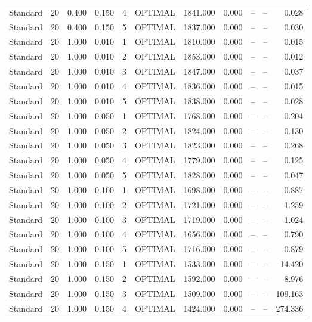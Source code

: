 \begin{table}
\begin{tabular}{lrrrrlrrrrr}
Standard & 20 & 0.400 & 0.150 & 4 & OPTIMAL & 1841.000 & 0.000 & -- & -- & 0.028 \\
Standard & 20 & 0.400 & 0.150 & 5 & OPTIMAL & 1837.000 & 0.000 & -- & -- & 0.030 \\
Standard & 20 & 1.000 & 0.010 & 1 & OPTIMAL & 1810.000 & 0.000 & -- & -- & 0.015 \\
Standard & 20 & 1.000 & 0.010 & 2 & OPTIMAL & 1853.000 & 0.000 & -- & -- & 0.012 \\
Standard & 20 & 1.000 & 0.010 & 3 & OPTIMAL & 1847.000 & 0.000 & -- & -- & 0.037 \\
Standard & 20 & 1.000 & 0.010 & 4 & OPTIMAL & 1836.000 & 0.000 & -- & -- & 0.015 \\
Standard & 20 & 1.000 & 0.010 & 5 & OPTIMAL & 1838.000 & 0.000 & -- & -- & 0.028 \\
Standard & 20 & 1.000 & 0.050 & 1 & OPTIMAL & 1768.000 & 0.000 & -- & -- & 0.204 \\
Standard & 20 & 1.000 & 0.050 & 2 & OPTIMAL & 1824.000 & 0.000 & -- & -- & 0.130 \\
Standard & 20 & 1.000 & 0.050 & 3 & OPTIMAL & 1823.000 & 0.000 & -- & -- & 0.268 \\
Standard & 20 & 1.000 & 0.050 & 4 & OPTIMAL & 1779.000 & 0.000 & -- & -- & 0.125 \\
Standard & 20 & 1.000 & 0.050 & 5 & OPTIMAL & 1828.000 & 0.000 & -- & -- & 0.047 \\
Standard & 20 & 1.000 & 0.100 & 1 & OPTIMAL & 1698.000 & 0.000 & -- & -- & 0.887 \\
Standard & 20 & 1.000 & 0.100 & 2 & OPTIMAL & 1721.000 & 0.000 & -- & -- & 1.259 \\
Standard & 20 & 1.000 & 0.100 & 3 & OPTIMAL & 1719.000 & 0.000 & -- & -- & 1.024 \\
Standard & 20 & 1.000 & 0.100 & 4 & OPTIMAL & 1656.000 & 0.000 & -- & -- & 0.790 \\
Standard & 20 & 1.000 & 0.100 & 5 & OPTIMAL & 1716.000 & 0.000 & -- & -- & 0.879 \\
Standard & 20 & 1.000 & 0.150 & 1 & OPTIMAL & 1533.000 & 0.000 & -- & -- & 14.420 \\
Standard & 20 & 1.000 & 0.150 & 2 & OPTIMAL & 1592.000 & 0.000 & -- & -- & 8.976 \\
Standard & 20 & 1.000 & 0.150 & 3 & OPTIMAL & 1509.000 & 0.000 & -- & -- & 109.163 \\
Standard & 20 & 1.000 & 0.150 & 4 & OPTIMAL & 1424.000 & 0.000 & -- & -- & 274.336 \\

\end{tabular}
\end{table}
